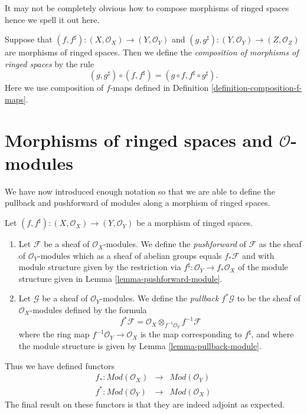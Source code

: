 \noindent
It may not be completely obvious how to compose morphisms of
ringed spaces hence we spell it out here.

\begin{definition}
\label{definition-composition-maps-ringed-spaces}
Suppose that
$(f, f^\sharp) : (X, \mathcal{O}_X) \to (Y, \mathcal{O}_Y)$ and
$(g, g^\sharp) : (Y, \mathcal{O}_Y) \to (Z, \mathcal{O}_Z)$
are morphisms of ringed spaces. Then we define
the {\it composition of morphisms of ringed spaces}
by the rule
$$
(g, g^\sharp) \circ (f, f^\sharp) = (g \circ f, f^\sharp \circ g^\sharp).
$$
Here we use composition of $f$-maps defined in
Definition \ref{definition-composition-f-maps}.
\end{definition}


\section{Morphisms of ringed spaces and $\mathcal{O}$-modules}
\label{section-ringed-spaces-functoriality-modules}

\noindent
We have now introduced enough notation so that we are able to
define the pullback and pushforward of modules along a morphism
of ringed spaces.

\begin{definition}
Let $(f, f^\sharp) : (X, \mathcal{O}_X) \to (Y, \mathcal{O}_Y)$
be a morphism of ringed spaces.
\begin{enumerate}
\item Let $\mathcal{F}$ be a sheaf of $\mathcal{O}_X$-modules.
We define the {\it pushforward} of $\mathcal{F}$ as the 
sheaf of $\mathcal{O}_Y$-modules which as a sheaf
of abelian groups equals $f_*\mathcal{F}$ and with
module structure given by the restriction
via $f^\sharp : \mathcal{O}_Y \to f_*\mathcal{O}_X$
of the module structure given
in Lemma \ref{lemma-pushforward-module}.
\item Let $\mathcal{G}$ be a sheaf of $\mathcal{O}_Y$-modules.
We define the {\it pullback} $f^*\mathcal{G}$ to be the
sheaf of $\mathcal{O}_X$-modules defined by the formula
$$
f^*\mathcal{F}
=
\mathcal{O}_X \otimes_{f^{-1}\mathcal{O}_Y} f^{-1}\mathcal{F}
$$
where the ring map $f^{-1}\mathcal{O}_Y \to \mathcal{O}_X$
is the map corresponding to $f^\sharp$, and where the  module
structure is given by Lemma \ref{lemma-pullback-module}.
\end{enumerate}
\end{definition}

\noindent
Thus we have defined functors
\begin{eqnarray*}
f_* : \textit{Mod}(\mathcal{O}_X) 
& \longrightarrow &
\textit{Mod}(\mathcal{O}_Y) \\
f^* : \textit{Mod}(\mathcal{O}_Y) 
& \longrightarrow &
\textit{Mod}(\mathcal{O}_X)
\end{eqnarray*}
The final result on these functors is that they are indeed
adjoint as expected.

